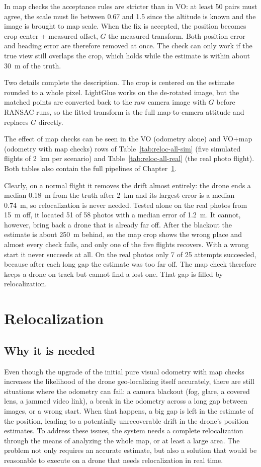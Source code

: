 \documentclass[english, Lau, oneside]{sapthesis}%
\begin{document}
In map checks the acceptance rules are stricter than in VO: at least 50 pairs must agree, the scale must lie between 0.67 and 1.5 since the altitude is known and the image is brought to map scale. When the fix is accepted, the position becomes crop center + measured offset, $G$ the measured transform. Both position error and heading error are therefore removed at once. The check can only work if the true view still overlaps the crop, which holds while the estimate is within about 30~m of the truth.

Two details complete the description. The crop is centered on the estimate rounded to a whole pixel. LightGlue works on the de-rotated image, but the matched points are converted back to the raw camera image with $G$ before RANSAC runs, so the fitted transform is the full map-to-camera attitude and replaces $G$ directly.

The effect of map checks can be seen in the VO (odometry alone) and VO+map (odometry with map checks) rows of Table~\ref{tab:reloc-all-sim} (five simulated flights of 2~km per scenario) and Table~\ref{tab:reloc-all-real} (the real photo flight). Both tables also contain the full pipelines of Chapter~\ref{chap:relocalization}.


Clearly, on a normal flight it removes the drift almost entirely: the drone ends a median 0.18~m from the truth after 2~km and its largest error is a median 0.74~m, so relocalization is never needed. Tested alone on the real photos from 15~m off, it located 51 of 58 photos with a median error of 1.2~m. It cannot, however, bring back a drone that is already far off. After the blackout the estimate is about 250~m behind, so the map crop shows the wrong place and almost every check fails, and only one of the five flights recovers. With a wrong start it never succeeds at all. On the real photos only 7 of 25 attempts succeeded, because after each long gap the estimate was too far off. The map check therefore keeps a drone on track but cannot find a lost one. That gap is filled by relocalization.

\chapter{Relocalization}
\label{chap:relocalization}
\section{Why it is needed}
\label{sec:reloc-why}
Even though the upgrade of the initial pure visual odometry with map checks increases the likelihood of the drone geo-localizing itself accurately, there are still situations where the odometry can fail: a camera blackout (fog, glare, a covered lens, a jammed video link), a break in the odometry across a long gap between images, or a wrong start. When that happens, a big gap is left in the estimate of the position, leading to a potentially unrecoverable drift in the drone's position estimates. To address these issues, the system needs a complete relocalization through the means of analyzing the whole map, or at least a large area. The problem not only requires an accurate estimate, but also a solution that would be reasonable to execute on a drone that needs relocalization in real time.
\end{document}
